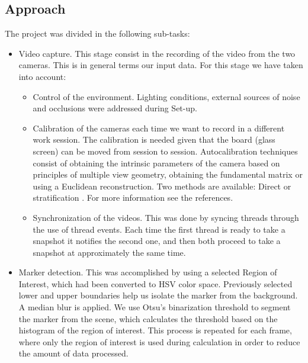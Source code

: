 \documentclass[a4paper,12pt]{article}
\begin{document}

\subsection*{Approach}
The project was divided in the following sub-tasks:
\begin{itemize}
    \item Video capture. This stage consist in the recording of the video from the two cameras. This is in general terms our input data. For this stage we have taken into account:
    \begin{itemize}
        \item  Control of the environment. Lighting conditions, external sources of noise and occlusions were addressed during Set-up.
        \item Calibration of the cameras each time we want to record in a different work session. The calibration is needed given that the board (glass screen) can be moved from session to session. Autocalibration techniques consist of obtaining the intrinsic parameters of the camera based on principles of multiple view geometry, obtaining the fundamental matrix or using a Euclidean reconstruction. Two methods are available: Direct \cite{mendoncca} or stratification \cite{faugeras}. For more information see the references.
        \item Synchronization of the videos. This was done by syncing threads through the use of thread events. Each time the first thread is ready to take a snapshot it notifies the second one, and then both proceed to take a snapshot at approximately the same time.
    \end{itemize}
 \item Marker detection. This was accomplished by using a selected Region of Interest, which had been converted to HSV color space. Previously selected lower and upper boundaries help us isolate the marker from the background. A median blur is applied. We use Otsu's binarization threshold to segment the marker from the scene, which calculates the threshold based on the histogram of the region of interest. This process is repeated for each frame, where only the region of interest is used during calculation in order to reduce the amount of data processed.
   

\end{itemize}
\end{document}
